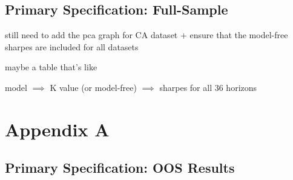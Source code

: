 \documentclass{article}
\begin{document}
\listoftables

\newpage

\subsection{Primary Specification: Full-Sample}



still need to add the pca graph for CA dataset + ensure that the model-free sharpes are included for all datasets


maybe a table that's like 

model $\implies$ K value (or model-free) $\implies$ sharpes for all 36 horizons





\newpage

\section{Appendix A}

\subsection{Primary Specification: OOS Results}

    






\end{document}
